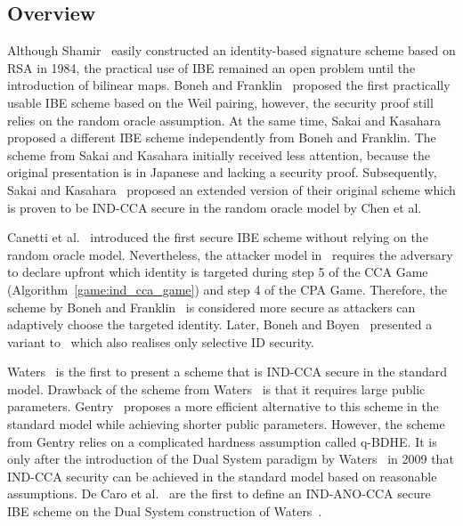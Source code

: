 \subsection{Overview}
\label{sec:evolution_of_ibe}
Although Shamir~\cite{art:Shamir84} easily constructed an identity-based signature scheme based on RSA in 1984, the practical use of IBE remained an open problem until the introduction of bilinear maps. Boneh and Franklin~\cite{art:BonehF01} proposed the first practically usable IBE scheme based on the Weil pairing, however, the security proof still relies on the random oracle assumption. At the same time, Sakai and Kasahara~\cite{art:SakaiOK01} proposed a different IBE scheme independently from Boneh and Franklin. The scheme from Sakai and Kasahara initially received less attention, because the original presentation is in Japanese and lacking a security proof. Subsequently, Sakai and Kasahara~\cite{art:SakaiK03} proposed an extended version of their original scheme which is proven to be IND-CCA secure in the random oracle model by Chen et al.~\cite{art:ChenC05} 

Canetti et al.~\cite{art:CanettiHK03} introduced the first secure IBE scheme without relying on the random oracle model. Nevertheless, the attacker model in~\cite{art:CanettiHK03} requires the adversary to declare upfront which identity \id{} is targeted during step 5 of the CCA Game (Algorithm~\ref{game:ind_cca_game}) and step 4 of the CPA Game. Therefore, the scheme by Boneh and Franklin~\cite{art:BonehF01} is considered more secure as attackers can adaptively choose the targeted identity. Later, Boneh and Boyen~\cite{art:BonehB04} presented a variant to~\cite{art:CanettiHK03} which also realises only selective ID security.

Waters~\cite{art:Waters05} is the first to present a scheme that is IND-CCA secure in the standard model. Drawback of the scheme from Waters~\cite{art:Waters05} is that it requires large public parameters. Gentry~\cite{art:Gentry06} proposes a more efficient alternative to this scheme in the standard model while achieving shorter public parameters. However, the scheme from Gentry relies on a complicated hardness assumption called q-BDHE. It is only after the introduction of the Dual System paradigm by Waters~\cite{art:Waters09} in 2009 that IND-CCA security can be achieved in the standard model based on reasonable assumptions. De Caro et al.~\cite{art:CaroIP10} are the first to define an IND-ANO-CCA secure IBE scheme on the Dual System construction of Waters~\cite{art:Waters09}. %

